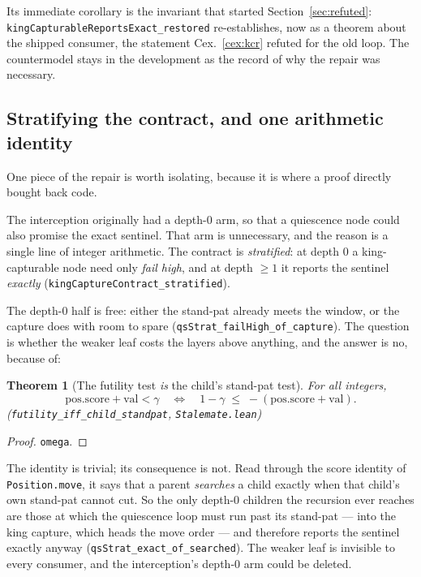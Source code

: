 \documentclass[11pt]{article}
\newcommand{\leanref}[2]{(\texttt{#1}, \texttt{#2})}%
\theoremstyle{plain}
\newtheorem{theorem}{Theorem}[section]
\theoremstyle{definition}
\theoremstyle{remark}
\begin{document}
Its immediate corollary is the invariant that started
Section~\ref{sec:refuted}: \texttt{kingCapturableReportsExact\_restored}
re-establishes, now as a theorem about the shipped consumer, the
statement Cex.~\ref{cex:kcr} refuted for the old loop.  The countermodel
stays in the development as the record of why the repair was necessary.

\subsection{Stratifying the contract, and one arithmetic identity}
\label{sec:strat}

One piece of the repair is worth isolating, because it is where a
proof directly bought back code.

The interception originally had a depth-0 arm, so that a quiescence
node could also promise the exact sentinel.  That arm is unnecessary,
and the reason is a single line of integer arithmetic.  The contract is
\emph{stratified}: at depth 0 a king-capturable node need only
\emph{fail high}, and at depth $\ge 1$ it reports the sentinel
\emph{exactly} (\texttt{kingCaptureContract\_stratified}).

The depth-0 half is free: either the stand-pat already meets the window,
or the capture does with room to spare
(\texttt{qsStrat\_failHigh\_of\_capture}).  The question is whether the
weaker leaf costs the layers above anything, and the answer is no,
because of:

\begin{theorem}[The futility test \emph{is} the child's stand-pat test]
\label{thm:futid}
For all integers,
\[
  \mathrm{pos.score} + \mathrm{val} < \gamma
  \quad\Longleftrightarrow\quad
  1 - \gamma \;\le\; -(\mathrm{pos.score} + \mathrm{val}).
\]
\leanref{futility\_iff\_child\_standpat}{Stalemate.lean}
\end{theorem}

\begin{proof}
\texttt{omega}.
\end{proof}

The identity is trivial; its consequence is not.  Read through the
score identity of \texttt{Position.move}, it says that a parent
\emph{searches} a child exactly when that child's own stand-pat cannot
cut.  So the only depth-0 children the recursion ever reaches are those
at which the quiescence loop must run past its stand-pat --- into the
king capture, which heads the move order --- and therefore reports the
sentinel exactly anyway (\texttt{qsStrat\_exact\_of\_searched}).  The
weaker leaf is invisible to every consumer, and the interception's
depth-0 arm could be deleted.
\end{document}
